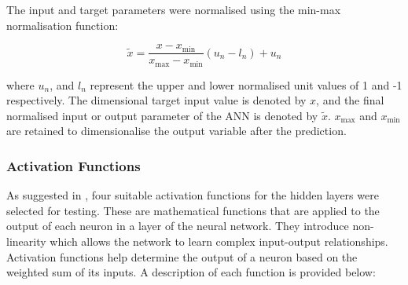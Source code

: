The input and target parameters were normalised using the min-max normalisation function:

\begin{equation}
	\tilde{x}=\frac{x-x_{\min }}{x_{\max }-x_{\min }}(u_n-l_n)+u_n
\end{equation}

where $u_n$, and $l_n$ represent the upper and lower normalised unit values of 1 and -1 respectively. The dimensional target input value is denoted by $x$, and the final normalised input or output parameter of the ANN is denoted by $\tilde{x}$. $x_{\max }$ and $x_{\min }$ are retained to dimensionalise the output variable after the prediction.

\subsubsection{Activation Functions} \label{Activation functions}

As suggested in \cite{Marian2022}, four suitable activation functions for the hidden layers were selected for testing. These are mathematical functions that are applied to the output of each neuron in a layer of the neural network. They introduce non-linearity which allows the network to learn complex input-output relationships. Activation functions help determine the output of a neuron based on the weighted sum of its inputs. A description of each function is provided below:

